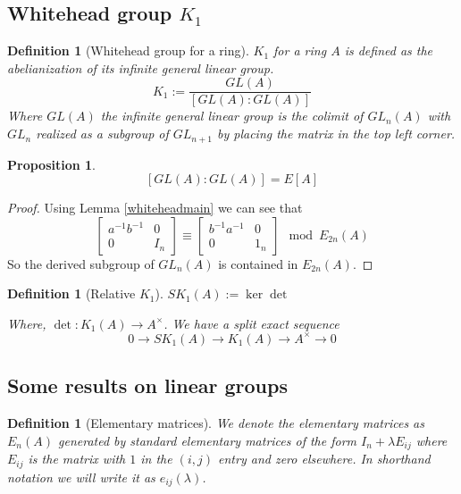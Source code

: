 \documentclass[12pt]{article}
\numberwithin{equation}{section}
\newcounter{dummy} \numberwithin{dummy}{section}
\newtheorem{definition}[dummy]{Definition}
\newtheorem{proposition}[dummy]{Proposition}
\begin{document}
	\subsection{Whitehead group $K_1$}
	\begin{definition}[Whitehead group for a ring] $K_1$ for a ring $A$ is defined as the abelianization of its infinite general linear group.
		$$K_1:= \frac{GL(A)}{[GL(A):GL(A)]}$$
		Where $GL(A)$ the infinite general linear group is the colimit of $GL_n(A)$ with $GL_{n}$ realized as a subgroup of $GL_{n+1}$ by placing the matrix in the top left corner. 
	\end{definition}
	\begin{proposition}
		\[ [GL(A):GL(A)]=E[A] \]
	\end{proposition}
	\begin{proof}
		Using Lemma \ref{whiteheadmain} we can see that \[ \begin{bmatrix}
			a^{-1}b^{-1} & 0 \\ 0 & I_n
		\end{bmatrix} \equiv \begin{bmatrix}
			b^{-1} a^{-1 } & 0 \\
			0 & 1_n
		\end{bmatrix} \mod E_{2n}(A)\]
		So the derived subgroup of $GL_n(A)$ is contained in $E_{2n}(A)$. 
	\end{proof}	
	
	
	\begin{definition}[Relative $K_1$]
		$SK_1(A):= \ker \det$
		
		Where, $\det : K_1(A) \to A^\times$. We have a split exact sequence
		\[ 0 \to SK_1(A) \to K_1(A) \to A^\times \to 0 \]
	\end{definition}
	
	
	\subsection{Some results on linear groups}
	\begin{definition}[Elementary matrices]
		We denote the elementary matrices as $E_n(A)$ generated by standard elementary matrices of the form $I_{n}+ \lambda E_{ij} $ where $E_{ij}$ is the matrix with $1$ in the $(i,j)$ entry and zero elsewhere. In shorthand notation we will write it as $e_{ij}(\lambda)$. 
	\end{definition}
	
\end{document}
